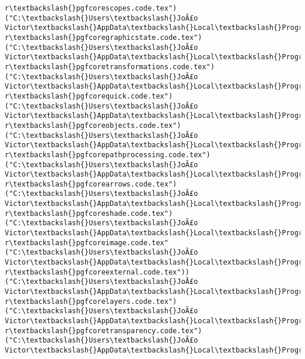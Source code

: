 \documentclass[11pt]{article}
\begin{document}
\begin{Verbatim}[commandchars=\\\{\}]
r\textbackslash{}pgfcorescopes.code.tex")
("C:\textbackslash{}Users\textbackslash{}JoÃ£o Victor\textbackslash{}AppData\textbackslash{}Local\textbackslash{}Programs\textbackslash{}MiKTeX\textbackslash{}tex/generic/pgf/basiclaye
r\textbackslash{}pgfcoregraphicstate.code.tex")
("C:\textbackslash{}Users\textbackslash{}JoÃ£o Victor\textbackslash{}AppData\textbackslash{}Local\textbackslash{}Programs\textbackslash{}MiKTeX\textbackslash{}tex/generic/pgf/basiclaye
r\textbackslash{}pgfcoretransformations.code.tex")
("C:\textbackslash{}Users\textbackslash{}JoÃ£o Victor\textbackslash{}AppData\textbackslash{}Local\textbackslash{}Programs\textbackslash{}MiKTeX\textbackslash{}tex/generic/pgf/basiclaye
r\textbackslash{}pgfcorequick.code.tex")
("C:\textbackslash{}Users\textbackslash{}JoÃ£o Victor\textbackslash{}AppData\textbackslash{}Local\textbackslash{}Programs\textbackslash{}MiKTeX\textbackslash{}tex/generic/pgf/basiclaye
r\textbackslash{}pgfcoreobjects.code.tex")
("C:\textbackslash{}Users\textbackslash{}JoÃ£o Victor\textbackslash{}AppData\textbackslash{}Local\textbackslash{}Programs\textbackslash{}MiKTeX\textbackslash{}tex/generic/pgf/basiclaye
r\textbackslash{}pgfcorepathprocessing.code.tex")
("C:\textbackslash{}Users\textbackslash{}JoÃ£o Victor\textbackslash{}AppData\textbackslash{}Local\textbackslash{}Programs\textbackslash{}MiKTeX\textbackslash{}tex/generic/pgf/basiclaye
r\textbackslash{}pgfcorearrows.code.tex")
("C:\textbackslash{}Users\textbackslash{}JoÃ£o Victor\textbackslash{}AppData\textbackslash{}Local\textbackslash{}Programs\textbackslash{}MiKTeX\textbackslash{}tex/generic/pgf/basiclaye
r\textbackslash{}pgfcoreshade.code.tex")
("C:\textbackslash{}Users\textbackslash{}JoÃ£o Victor\textbackslash{}AppData\textbackslash{}Local\textbackslash{}Programs\textbackslash{}MiKTeX\textbackslash{}tex/generic/pgf/basiclaye
r\textbackslash{}pgfcoreimage.code.tex"
("C:\textbackslash{}Users\textbackslash{}JoÃ£o Victor\textbackslash{}AppData\textbackslash{}Local\textbackslash{}Programs\textbackslash{}MiKTeX\textbackslash{}tex/generic/pgf/basiclaye
r\textbackslash{}pgfcoreexternal.code.tex"))
("C:\textbackslash{}Users\textbackslash{}JoÃ£o Victor\textbackslash{}AppData\textbackslash{}Local\textbackslash{}Programs\textbackslash{}MiKTeX\textbackslash{}tex/generic/pgf/basiclaye
r\textbackslash{}pgfcorelayers.code.tex")
("C:\textbackslash{}Users\textbackslash{}JoÃ£o Victor\textbackslash{}AppData\textbackslash{}Local\textbackslash{}Programs\textbackslash{}MiKTeX\textbackslash{}tex/generic/pgf/basiclaye
r\textbackslash{}pgfcoretransparency.code.tex")
("C:\textbackslash{}Users\textbackslash{}JoÃ£o Victor\textbackslash{}AppData\textbackslash{}Local\textbackslash{}Programs\textbackslash{}MiKTeX\textbackslash{}tex/generic/pgf/basiclaye

\end{Verbatim}
\end{document}
